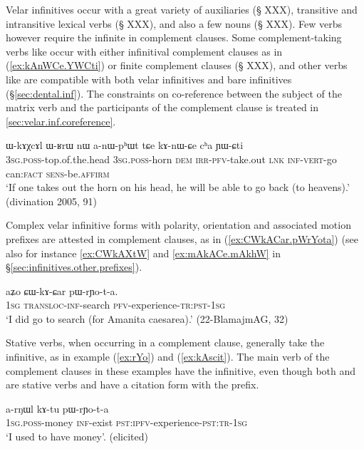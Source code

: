 Velar infinitives occur with a great variety of auxiliaries (§ XXX), transitive and intransitive lexical verbs (§ XXX), and also a few nouns (§ XXX). Few verbs however require the infinite in complement clauses. Some complement-taking verbs like  occur with either infinitival complement clauses as in (\ref{ex:kAnWCe.YWCti}) or finite complement clauses (§ XXX), and other verbs like  are compatible with both velar infinitives and bare infinitives (§\ref{sec:dental.inf}). The constraints on co-reference between the subject of the matrix verb and the participants of the complement clause is treated in \ref{sec:velar.inf.coreference}.

\begin{exe}
\ex \label{ex:kAnWCe.YWCti}
 \gll  ɯ-kɤχcɤl ɯ-ʁrɯ nɯ a-nɯ-pʰɯt tɕe kɤ-nɯ-ɕe cʰa ɲɯ-ɕti \\
 \textsc{3sg}.\textsc{poss}-top.of.the.head \textsc{3sg}.\textsc{poss}-horn \textsc{dem} \textsc{irr}-\textsc{pfv}-take.out \textsc{lnk} \textsc{inf}-\textsc{vert}-go can:\textsc{fact} \textsc{sens}-be.\textsc{affirm} \\
\glt `If one takes out the horn on his head, he will be able to go back (to heavens).' (divination 2005, 91)
\end{exe}
 
 Complex velar infinitive forms with polarity, orientation and associated motion prefixes are attested in complement clauses, as in (\ref{ex:CWkACar.pWrYota}) (see also for instance \ref{ex:CWkAXtW} and \ref{ex:mAkACe.mAkhW} in §\ref{sec:infinitives.other.prefixes}).
 
\begin{exe}
\ex \label{ex:CWkACar.pWrYota}
 \gll aʑo ɕɯ-kɤ-ɕar pɯ-rɲo-t-a. \\
 \textsc{1sg} \textsc{transloc}-\textsc{inf}-search \textsc{pfv}-experience-\textsc{tr}:\textsc{pst}-\textsc{1sg} \\
 \glt `I did go to search (for Amanita caesarea).'  (22-BlamajmAG, 32)
\end{exe}

Stative verbs, when occurring in a complement clause, generally take the  infinitive, as in example  (\ref{ex:rYo}) and (\ref{ex:kAscit}). The main verb of the complement clauses in these examples have the  infinitive, even though both  and  are stative verbs and have a citation form with the  prefix.

\begin{exe}
\ex \label{ex:rYo}
\gll   a-rŋɯl kɤ-tu pɯ-rɲo-t-a \\
\textsc{1sg.poss}-money \textsc{inf}-exist \textsc{pst:ipfv}-experience-\textsc{pst:tr-1sg} \\
\glt `I used to have money'. (elicited)
\end{exe}

